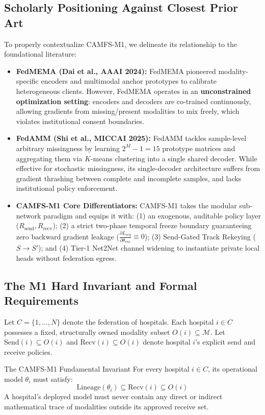 \documentclass[10pt,a4paper]{article}
\begin{document}
\subsection{Scholarly Positioning Against Closest Prior Art}
To properly contextualize CAMFS-M1, we delineate its relationship to the foundational literature:
\begin{itemize}[itemsep=1.5pt, topsep=1.5pt]
    \item \textbf{FedMEMA (Dai et al., AAAI 2024):} FedMEMA pioneered modality-specific encoders and multimodal anchor prototypes to calibrate heterogeneous clients. However, FedMEMA operates in an \textbf{unconstrained optimization setting}: encoders and decoders are co-trained continuously, allowing gradients from missing/present modalities to mix freely, which violates institutional consent boundaries.
    \item \textbf{FedAMM (Shi et al., MICCAI 2025):} FedAMM tackles sample-level arbitrary missingness by learning $2^M - 1 = 15$ prototype matrices and aggregating them via $K$-means clustering into a single shared decoder. While effective for stochastic missingness, its single-decoder architecture suffers from gradient thrashing between complete and incomplete samples, and lacks institutional policy enforcement.
    \item \textbf{CAMFS-M1 Core Differentiators:} CAMFS-M1 takes the modular sub-network paradigm and equips it with: (1) an exogenous, auditable policy layer ($R_{\text{send}}, R_{\text{recv}}$); (2) a strict two-phase temporal freeze boundary guaranteeing zero backward gradient leakage ($\frac{\partial L_{seg}}{\partial \theta_{enc}} \equiv 0$); (3) Send-Gated Track Rekeying ($S \to S'$); and (4) Tier-1 Net2Net channel widening to instantiate private local heads without federation egress.
\end{itemize}

\subsection{The M1 Hard Invariant and Formal Requirements}
Let $C = \{1, \dots, N\}$ denote the federation of hospitals. Each hospital $i \in C$ possesses a fixed, structurally owned modality subset $O(i) \subseteq \mathcal{M}$. Let $\text{Send}(i) \subseteq O(i)$ and $\text{Recv}(i) \subseteq O(i)$ denote hospital $i$'s explicit send and receive policies.

\begin{infobox}{The CAMFS-M1 Fundamental Invariant}
For every hospital $i \in C$, its operational model $\theta_i$ must satisfy:
\begin{equation}
    \text{Lineage}(\theta_i) \subseteq \text{Recv}(i) \subseteq O(i)
\end{equation}
A hospital's deployed model must never contain any direct or indirect mathematical trace of modalities outside its approved receive set.
\end{infobox}
\end{document}

